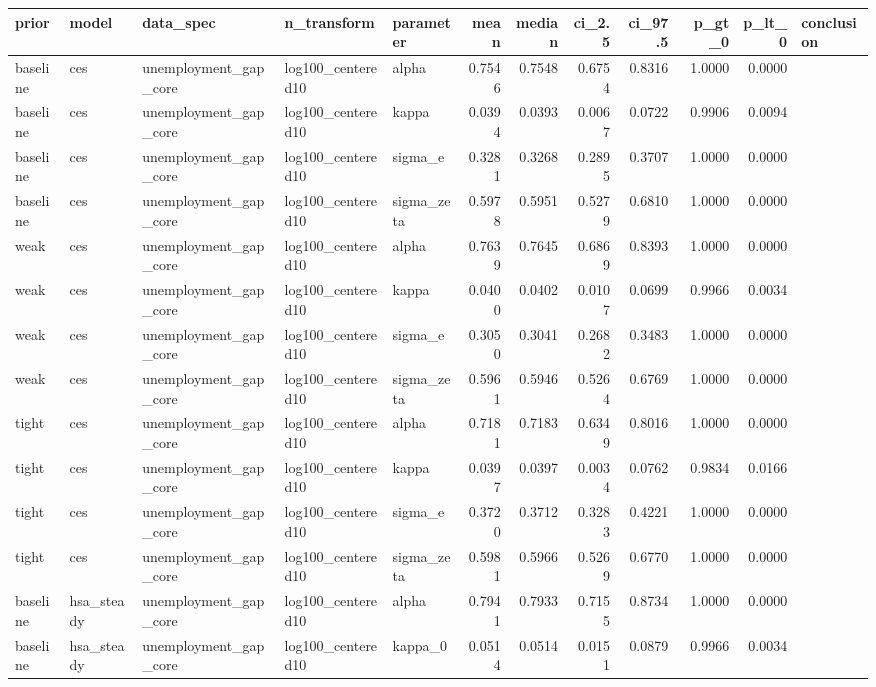 \begin{tabular}{lllllrrrrrrl}
\toprule
prior & model & data\_spec & n\_transform & parameter & mean & median & ci\_2.5 & ci\_97.5 & p\_gt\_0 & p\_lt\_0 & conclusion \\
\midrule
baseline & ces & unemployment\_gap\_core & log100\_centered10 & alpha & 0.7546 & 0.7548 & 0.6754 & 0.8316 & 1.0000 & 0.0000 &  \\
baseline & ces & unemployment\_gap\_core & log100\_centered10 & kappa & 0.0394 & 0.0393 & 0.0067 & 0.0722 & 0.9906 & 0.0094 &  \\
baseline & ces & unemployment\_gap\_core & log100\_centered10 & sigma\_e & 0.3281 & 0.3268 & 0.2895 & 0.3707 & 1.0000 & 0.0000 &  \\
baseline & ces & unemployment\_gap\_core & log100\_centered10 & sigma\_zeta & 0.5978 & 0.5951 & 0.5279 & 0.6810 & 1.0000 & 0.0000 &  \\
weak & ces & unemployment\_gap\_core & log100\_centered10 & alpha & 0.7639 & 0.7645 & 0.6869 & 0.8393 & 1.0000 & 0.0000 &  \\
weak & ces & unemployment\_gap\_core & log100\_centered10 & kappa & 0.0400 & 0.0402 & 0.0107 & 0.0699 & 0.9966 & 0.0034 &  \\
weak & ces & unemployment\_gap\_core & log100\_centered10 & sigma\_e & 0.3050 & 0.3041 & 0.2682 & 0.3483 & 1.0000 & 0.0000 &  \\
weak & ces & unemployment\_gap\_core & log100\_centered10 & sigma\_zeta & 0.5961 & 0.5946 & 0.5264 & 0.6769 & 1.0000 & 0.0000 &  \\
tight & ces & unemployment\_gap\_core & log100\_centered10 & alpha & 0.7181 & 0.7183 & 0.6349 & 0.8016 & 1.0000 & 0.0000 &  \\
tight & ces & unemployment\_gap\_core & log100\_centered10 & kappa & 0.0397 & 0.0397 & 0.0034 & 0.0762 & 0.9834 & 0.0166 &  \\
tight & ces & unemployment\_gap\_core & log100\_centered10 & sigma\_e & 0.3720 & 0.3712 & 0.3283 & 0.4221 & 1.0000 & 0.0000 &  \\
tight & ces & unemployment\_gap\_core & log100\_centered10 & sigma\_zeta & 0.5981 & 0.5966 & 0.5269 & 0.6770 & 1.0000 & 0.0000 &  \\
baseline & hsa\_steady & unemployment\_gap\_core & log100\_centered10 & alpha & 0.7941 & 0.7933 & 0.7155 & 0.8734 & 1.0000 & 0.0000 &  \\
baseline & hsa\_steady & unemployment\_gap\_core & log100\_centered10 & kappa\_0 & 0.0514 & 0.0514 & 0.0151 & 0.0879 & 0.9966 & 0.0034 &  \\

\end{tabular}
